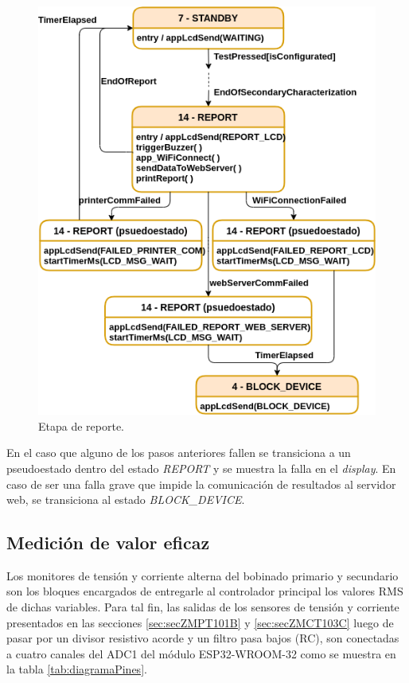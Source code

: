 \pagebreak

\begin{figure}[ht]
	\centering
	\includegraphics[scale=1]{./Figures/MainFSM_4.png}
	\caption{Etapa de reporte.}
	\label{fig:MainFSM_4}
\end{figure}

En el caso que alguno de los pasos anteriores fallen se transiciona a un pseudoestado dentro del estado \textit{REPORT} y se muestra la falla en el \textit{display}. En caso de ser una falla grave que impide la comunicación de resultados al servidor web, se transiciona al estado \textit{BLOCK\_DEVICE}.

\subsection{Medición de valor eficaz}
\label{subsec:RMS}

Los monitores de tensión y corriente alterna del bobinado primario y secundario son los bloques encargados de entregarle al controlador principal los valores RMS de dichas variables. Para tal fin, las salidas de los sensores de tensión y corriente presentados en las secciones \ref{sec:secZMPT101B} y \ref{sec:secZMCT103C} luego de pasar por un divisor resistivo acorde y un filtro pasa bajos (RC), son conectadas a cuatro canales del ADC1 del módulo ESP32-WROOM-32 como se muestra en la tabla \ref{tab:diagramaPines}.

